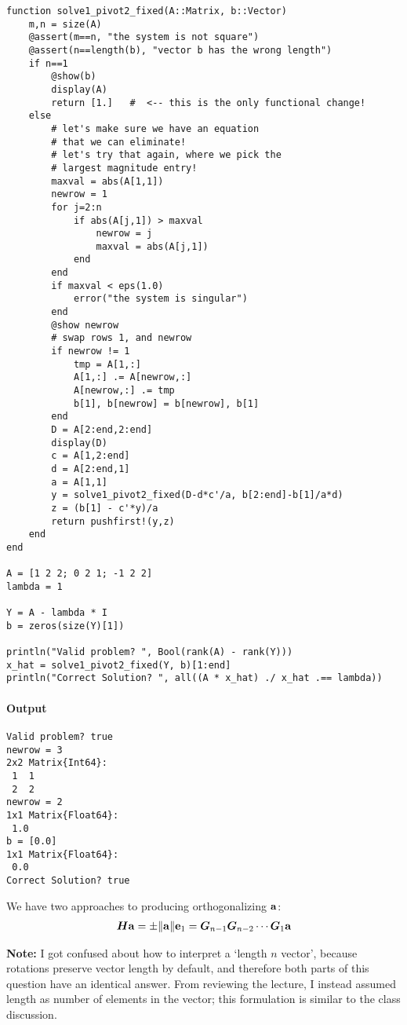 \documentclass[]{exam}
\let\oldparagraph\paragraph
\renewcommand{\paragraph}[1]{\oldparagraph{#1}\mbox{}}
\begin{document}
\begin{questions}
\begin{lstlisting}
function solve1_pivot2_fixed(A::Matrix, b::Vector)
	m,n = size(A)
	@assert(m==n, "the system is not square")
	@assert(n==length(b), "vector b has the wrong length")
	if n==1
		@show(b)
		display(A)
		return [1.]   #  <-- this is the only functional change!
	else
		# let's make sure we have an equation
		# that we can eliminate!
		# let's try that again, where we pick the
		# largest magnitude entry!
		maxval = abs(A[1,1])
		newrow = 1
		for j=2:n
			if abs(A[j,1]) > maxval
				newrow = j
				maxval = abs(A[j,1])
			end
		end
		if maxval < eps(1.0)
			error("the system is singular")
		end
		@show newrow
		# swap rows 1, and newrow
		if newrow != 1
			tmp = A[1,:]
			A[1,:] .= A[newrow,:]
			A[newrow,:] .= tmp
			b[1], b[newrow] = b[newrow], b[1]
		end
		D = A[2:end,2:end]
		display(D)
		c = A[1,2:end]
		d = A[2:end,1]
		a = A[1,1]
		y = solve1_pivot2_fixed(D-d*c'/a, b[2:end]-b[1]/a*d)
		z = (b[1] - c'*y)/a
		return pushfirst!(y,z)
	end
end

A = [1 2 2; 0 2 1; -1 2 2]
lambda = 1

Y = A - lambda * I
b = zeros(size(Y)[1])

println("Valid problem? ", Bool(rank(A) - rank(Y)))
x_hat = solve1_pivot2_fixed(Y, b)[1:end]
println("Correct Solution? ", all((A * x_hat) ./ x_hat .== lambda))
\end{lstlisting}

\paragraph{Output}
\begin{lstlisting}
Valid problem? true
newrow = 3
2x2 Matrix{Int64}:
 1  1
 2  2
newrow = 2
1x1 Matrix{Float64}:
 1.0
b = [0.0]
1x1 Matrix{Float64}:
 0.0
Correct Solution? true
\end{lstlisting}

\newpage
\question
\hfill

We have two approaches to producing orthogonalizing $\boldsymbol{\mathrm{a}}$:
\begin{gather*}
	\boldsymbol{H} \boldsymbol{\mathrm{a}} = \pm \| \boldsymbol{\mathrm{a}} \| \boldsymbol{\mathrm{e}}_1 = \boldsymbol{G}_{n-1} \boldsymbol{G}_{n-2} \cdots \boldsymbol{G}_1 \boldsymbol{\mathrm{a}}
\end{gather*}

\textbf{Note:}
I got confused about how to interpret a `length $n$ vector', because rotations preserve vector length by default, and therefore both parts of this question have an identical answer. From reviewing the lecture, I instead assumed length as number of elements in the vector; this formulation is similar to the class discussion.


\end{questions}
\end{document}

